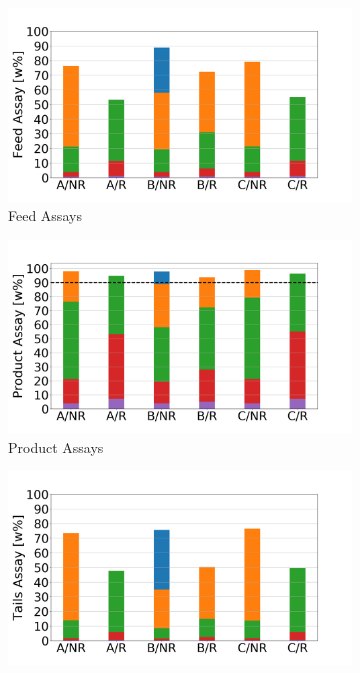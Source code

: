 \begin{figure}[h!]
    \centering
    \begin{subfigure}[t]{0.45\textwidth}
        \centering
        \includegraphics[width=\linewidth]{feed_assays}
        \caption{Feed Assays}
        \label{sfig:feed_assay}
    \end{subfigure}%
    \begin{subfigure}[t]{0.45\textwidth}
        \centering
        \includegraphics[width=\linewidth]{product_assays}
        \caption{Product Assays}
        \label{sfig:product_assay}
    \end{subfigure}
    \begin{subfigure}[t]{0.45\textwidth}
        \centering
        \includegraphics[scale=0.2]{tails_assays}

\end{subfigure}
\end{figure}
